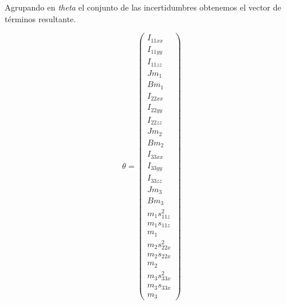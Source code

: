 Agrupando en \textit{theta} el conjunto de las incertidumbres obtenemos el vector de términos resultante.

\begin{equation}
\theta=
\begin{pmatrix}
I_{11xx} \\

I_{11yy}\\

I_{11zz}\\

Jm_{1} \\

Bm_{1} \\

I_{22xx} \\

I_{22yy}\\

I_{22zz}\\

Jm_{2} \\

Bm_{2} \\

I_{33xx} \\

I_{33yy}\\

I_{33zz}\\

Jm_{3} \\

Bm_{3} \\

m_{1}s_{11z}^{2} \\

m_{1}s_{11z} \\

m_{1}\\

m_{2}s_{22x}^{2} \\

m_{2}s_{22x} \\

m_{2}\\

m_{3}s_{33x}^{2} \\

m_{3}s_{33x} \\

m_{3}
\end{pmatrix}
\end{equation}



